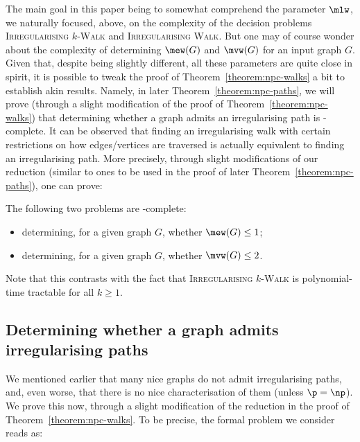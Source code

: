 \documentclass[a4paper,11pt,dvipsnames]{elsarticle}
\begin{document}
The main goal in this paper being to somewhat comprehend the parameter $\mlw$, we naturally focused, above, on the complexity of the decision problems \textsc{Irregularising $k$-Walk} and \textsc{Irregularising Walk}. But one may of course wonder about the complexity of determining $\mew(G)$ and $\mvw(G)$ for an input graph $G$. Given that, despite being slightly different, all these parameters are quite close in spirit, it is possible to tweak the proof of Theorem~\ref{theorem:npc-walks} a bit to establish akin results. Namely, in later Theorem~\ref{theorem:npc-paths}, we will prove (through a slight modification of the proof of Theorem~\ref{theorem:npc-walks}) that determining whether a graph admits an irregularising path is \np-complete. It can be observed that finding an irregularising walk with certain restrictions on how edges/vertices are traversed is actually equivalent to finding an irregularising path. More precisely, through slight modifications of our reduction (similar to ones to be used in the proof of later Theorem~\ref{theorem:npc-paths}), one can prove:

\begin{corollary}\label{cor:np-c}
The following two problems are \np-complete:
\begin{itemize}
    \item determining, for a given graph $G$, whether $\mew(G) \leq 1$;
    \item determining, for a given graph $G$, whether $\mvw(G) \leq 2$.
\end{itemize}
\end{corollary}

Note that this contrasts with the fact that \textsc{Irregularising $k$-Walk} is polynomial-time tractable for all $k \geq 1$.




\subsection{Determining whether a graph admits irregularising paths}

We mentioned earlier that many nice graphs do not admit irregularising paths,
and, even worse, that there is no nice characterisation of them (unless $\p=\np$).
We prove this now, through a slight modification of the reduction in the proof of Theorem~\ref{theorem:npc-walks}.
To be precise, the formal problem we consider reads as:
\end{document}
